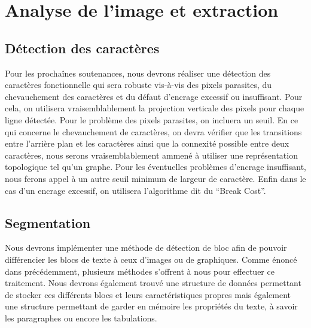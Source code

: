 \documentclass[]{report}
\begin{document}
\chapter{Analyse de l'image et extraction} %
\label{cha:analyse_de_l'image_et_extraction}

    \section{D\'etection des caractères} %
    \label{sec:d'etection_des_caractères}
      Pour les prochaînes soutenances, nous devrons réaliser une détection des caractères fonctionnelle qui sera robuste vis-à-vis des pixels parasites, du chevauchement des caractères et du défaut d'encrage excessif ou insuffisant. Pour cela, on utilisera vraisemblablement la projection verticale des pixels pour chaque ligne détectée. Pour le problème des pixels parasites, on incluera un seuil. En ce qui concerne le  chevauchement de caractères, on devra vérifier que les transitions entre l'arrière plan et les caractères ainsi que la connexité possible entre deux caractères, nous serons vraisemblablement ammené à utiliser une représentation topologique tel qu'un graphe. Pour les éventuelles problèmes d'encrage insuffisant, nous ferons appel à un autre seuil minimum de largeur de caractère. Enfin dans le cas d'un encrage excessif, on utilisera l'algorithme dit du ``Break Cost''.


    \section{Segmentation} %
    \label{sec:s\'egmentation}
  		Nous devrons implémenter une méthode de détection de bloc afin de pouvoir différencier les blocs de texte à ceux d'images ou de graphiques. Comme énoncé dans précédemment, plusieurs méthodes s'offrent à nous pour effectuer ce traitement. Nous devrons également trouvé une structure de données permettant de stocker ces différents blocs et leurs caractéristiques propres mais également une structure permettant de garder en mémoire les propriétés du texte, à savoir les paragraphes ou encore les tabulations.



\end{document}
